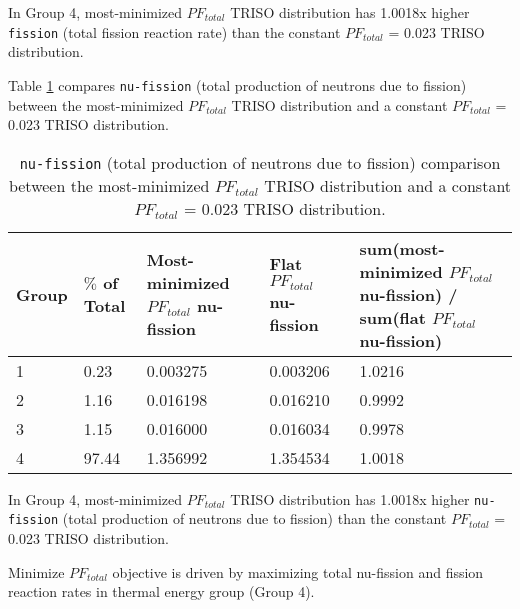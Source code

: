 In Group 4, most-minimized $PF_{total}$ TRISO distribution has 1.0018x higher  
\texttt{fission} (total fission reaction rate) than the 
constant $PF_{total}$ = 0.023 TRISO distribution.

Table \ref{tab:0.023-plank-nu-fission-rate} compares \texttt{nu-fission} (total 
production of neutrons due to fission) between the most-minimized $PF_{total}$ TRISO 
distribution and a constant $PF_{total}$ = 0.023 TRISO distribution.
\begin{table}[H]
    \centering
    \onehalfspacing
    \caption{\texttt{nu-fission} (total production of neutrons due to fission) comparison 
    between the most-minimized $PF_{total}$ TRISO distribution and a constant 
    $PF_{total}$ = 0.023 TRISO distribution.}
	\label{tab:0.023-plank-nu-fission-rate}
    \footnotesize
    \begin{tabular}{llp{4cm}p{2.7cm}p{6cm}}
    \hline
    \textbf{Group} & 
    \textbf{$\%$ of Total} &
    \textbf{Most-minimized $PF_{total}$ nu-fission} & 
    \textbf{Flat $PF_{total}$ nu-fission} & 
    \textbf{sum(most-minimized $PF_{total}$ nu-fission) / sum(flat $PF_{total}$ nu-fission)}\\
    \hline 
    1 & 0.23 & 0.003275 & 0.003206 & 1.0216 \\
    2 & 1.16 & 0.016198 & 0.016210 & 0.9992 \\
    3 & 1.15 & 0.016000 & 0.016034 & 0.9978 \\
    4 & 97.44& 1.356992 & 1.354534 & 1.0018 \\
    \hline
    \end{tabular}
\end{table}

In Group 4, most-minimized $PF_{total}$ TRISO distribution has 1.0018x higher  
\texttt{nu-fission} (total production of neutrons due to fission) than the 
constant $PF_{total}$ = 0.023 TRISO distribution.

Minimize $PF_{total}$ objective is driven by maximizing total nu-fission and fission 
reaction rates in thermal energy group (Group 4). 